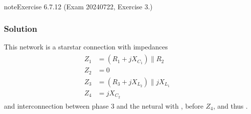 \documentclass[letterpaper,10pt,english]{jupyterBook}
\begin{document}
\begin{sphinxadmonition}{note}{Exercise 6.7.12 (Exam 2024\sphinxhyphen{}07\sphinxhyphen{}22, Exercise 3.)}



\begin{figure}[htbp]
\centering

\noindent{}
\end{figure}
\subsubsection*{Solution}

\sphinxAtStartPar
This network is a star\sphinxhyphen{}star connection with impedances
\begin{equation*}
\begin{split}\begin{aligned}
  Z_1 & = ( R_1 + j X_{C_1} ) \parallel R_2 \\
  Z_2 & = 0 \\
  Z_3 & = ( R_3 + j X_{L_2} ) \parallel j X_{L_1} \\
  Z_4 & = j X_{C_2}
\end{aligned}\end{split}
\end{equation*}
\sphinxAtStartPar
and inter\sphinxhyphen{}connection between phase \(3\) and the netural with , before \(Z_4\), and thus .


\end{sphinxadmonition}
\end{document}
